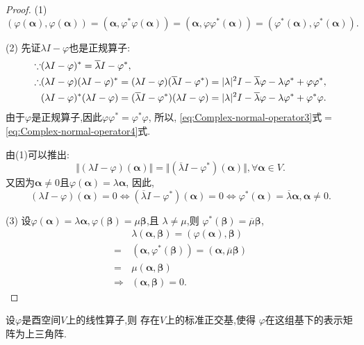 \begin{proof}
  (1)
  \[
    (\varphi(\bm{\alpha}), \varphi(\bm{\alpha}))=
    (\bm{\alpha}, \varphi^*\varphi(\bm{\alpha}))=
    (\bm{\alpha},\varphi\varphi^*(\bm{\alpha}))=
    (\varphi^*(\bm{\alpha}),\varphi^*(\bm{\alpha})).
  \]

  (2) 先证$\lambda I-\varphi$也是正规算子:
  \begin{align}
    \because & (\lambda I-\varphi)^*=\overline{\lambda}I-\varphi^*,\notag\\
    \therefore & (\lambda I-\varphi)(\lambda I-\varphi)^*=
      (\lambda I-\varphi)(\overline{\lambda}I-\varphi^*)=
                 |\lambda|^2I-\overline{\lambda}\varphi-\lambda\varphi^*+\varphi\varphi^*,\label{eq:Complex-normal-operator3}\\
             & (\lambda I-\varphi)^*(\lambda I-\varphi) =
               (\overline{\lambda}I-\varphi^*)(\lambda I-\varphi) = 
               |\lambda|^2I-\overline{\lambda}\varphi-\lambda\varphi^*+\varphi^*\varphi.\label{eq:Complex-normal-operator4}
  \end{align}
  由于$\varphi$是正规算子,因此$\varphi\varphi^*=\varphi^*\varphi$,
  所以, \eqref{eq:Complex-normal-operator3}式$=$\eqref{eq:Complex-normal-operator4}式.

  由(1)可以推出:
  \[
    \Vert(\lambda I-\varphi)(\bm{\alpha})\Vert=
    \Vert(\overline{\lambda}I-\varphi^*)(\bm{\alpha})\Vert,
    \forall \bm{\alpha}\in V.
  \]
  又因为$\bm{\alpha}\neq 0$且$\varphi(\bm{\alpha})=\lambda\bm{\alpha}$,
  因此,
  \[
    (\lambda I-\varphi)(\bm{\alpha})=0 \Longleftrightarrow
    (\overline{\lambda}I-\varphi^*)(\bm{\alpha}) = 0 \Longleftrightarrow
    \varphi^*(\bm{\alpha})=\overline{\lambda}\bm{\alpha},\bm{\alpha}\neq 0.
  \]

  (3) 设$\varphi(\bm{\alpha})=\lambda\bm{\alpha},
  \varphi(\bm{\beta})=\mu\bm{\beta}$,且
  $\lambda\neq \mu$,则
  $\varphi^*(\bm{\beta})=\overline{\mu}\bm{\beta}$,
  \begin{align*}
    & \lambda(\bm{\alpha},\bm{\beta})=(\varphi(\bm{\alpha}),\bm{\beta})\\
    = & (\bm{\alpha},\varphi^*(\bm{\beta})) =
        (\bm{\alpha}, \overline{\mu}\bm{\beta})\\
    = & \mu(\bm{\alpha},\bm{\beta})\\
    \Longrightarrow & (\bm{\alpha},\bm{\beta})=0.
  \end{align*}
\end{proof}

\begin{theorem}[Schur定理]\label{thm:Complex-normal-operator1}
  设$\varphi$是酉空间$V$上的线性算子,则
  存在$V$上的标准正交基,使得
  $\varphi$在这组基下的表示矩阵为上三角阵.
\end{theorem}

